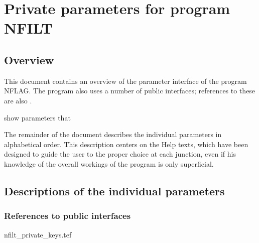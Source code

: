 
\chapter{ Private parameters for program NFILT}
\tableofcontents


\section{ Overview}

	This document contains an overview of the parameter interface of the
program NFLAG. The program also uses a number of public interfaces; references
to these are also .

show %
parameters that %


	The remainder of the document describes the individual parameters in
alphabetical order. This description centers on the Help texts, which have been
designed to guide the user to the proper choice at each junction, even if his
knowledge of the overall workings of the program is only superficial.


\section{ Descriptions of the individual parameters}
\label{.descriptions}

\subsection{ References to public interfaces}
\label{.public}

 {nfilt_private_keys.tef}
